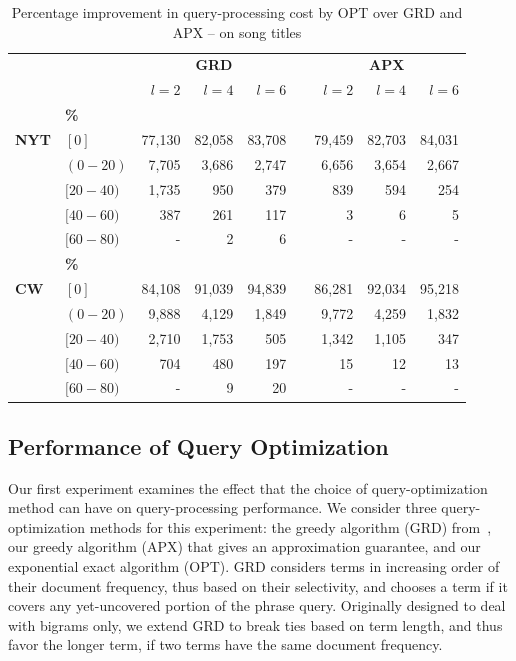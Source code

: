 \begin{table}\centering \footnotesize
\begin{tabular}{@{}llrrrcrrr@{}}\toprule
& & \multicolumn{3}{c}{\textbf{GRD}} & \phantom{abc} & \multicolumn{3}{c}{\textbf{APX}}\\ 
\cmidrule{3-5} \cmidrule{7-9}
& & $l=2$ & $l=4$ & $l=6$ && $l=2$ & $l=4$ & $l=6$\\ \midrule
&\textbf{\%}\\
\textbf{NYT}& $[0]$ & 77,130 & 82,058 & 83,708 && 79,459 & 82,703 & 84,031\\
& $(0-20)$ & 7,705 & 3,686 & 2,747 && 6,656  & 3,654 & 2,667\\
& $[20-40)$ & 1,735 & 950 & 379 && 839 & 594 & 254 \\
& $[40-60)$ & 387 & 261 & 117 && 3 & 6 & 5\\ 
& $[60-80)$ & - & 2 & 6 && - & - & - \\
\midrule

&\textbf{\%}\\
\textbf{CW}& $[0]$ & 84,108 & 91,039 & 94,839 && 86,281 & 92,034 & 95,218 \\
& $(0-20)$ & 9,888 & 4,129 & 1,849 && 9,772 & 4,259 & 1,832\\
& $[20-40)$ & 2,710 & 1,753 & 505 && 1,342 & 1,105 & 347 \\
& $[40-60)$ & 704 & 480 & 197 && 15 & 12 & 13 \\
& $[60-80)$ & - & 9 & 20 && - & - & -\\
\bottomrule
\end{tabular}
\caption{Percentage improvement in query-processing cost by OPT over GRD and APX -- on song titles}

\label{tab:songs_optimizers}
\end{table}

\subsection{Performance of Query Optimization}

Our first experiment examines the effect that the choice of
query-optimization method can have on query-processing performance. We
consider three query-optimization methods for this experiment: the
greedy algorithm (GRD) from~\cite{Williams:2004fk}, our greedy
algorithm (APX) that gives an approximation guarantee, and our
exponential exact algorithm (OPT). GRD considers terms in increasing
order of their document frequency, thus based on their selectivity,
and chooses a term if it covers any yet-uncovered portion of the
phrase query. Originally designed to deal with bigrams only, we extend
GRD to break ties based on term length, and thus favor the longer
term, if two terms have the same document frequency.

